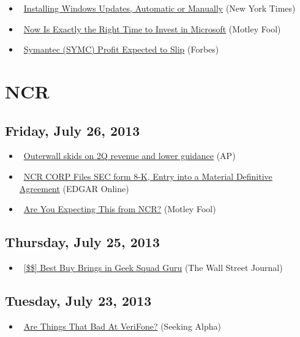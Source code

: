 \documentclass[11pt,asymmetric]{article}
\begin{document}
\begin{itemize}
\item\ \href{http://www.nytimes.com/2013/07/27/technology/personaltech/installing-windows-updates-automatic-or-manually.html?partner=yahoofinance}{Installing Windows Updates, Automatic or Manually} (New York Times)
\item\ \href{http://beta.fool.com/yieke/2013/07/26/it-is-exactly-the-best-time-to-invest-in-microsoft/41255/?source=eogyholnk0000001}{Now Is Exactly the Right Time to Invest in Microsoft} (Motley Fool)
\item\ \href{http://www.forbes.com/sites/narrativescience/2013/07/26/symantec-symc-profit-expected-to-slip/?partner=yahootix}{Symantec (SYMC) Profit Expected to Slip} (Forbes)
\end{itemize}

\section*{NCR}

\subsection*{Friday, July 26, 2013}
\begin{itemize}
\item\ \href{http://finance.yahoo.com/news/outerwall-skids-2q-revenue-lower-141647186.html}{Outerwall skids on 2Q revenue and lower guidance} (AP)
\item\ \href{http://biz.yahoo.com/e/130726/ncr8-k.html}{NCR CORP Files SEC form 8-K, Entry into a Material Definitive Agreement} (EDGAR Online)
\item\ \href{http://www.fool.com/investing/general/2013/07/26/are-you-expecting-this-from-ncr.aspx?source=eptyholnk303100&logvisit=y&npu=y}{Are You Expecting This from NCR?} (Motley Fool)
\end{itemize}
\subsection*{Thursday, July 25, 2013}
\begin{itemize}
\item\ \href{http://online.wsj.com/article/SB10001424127887323610704578627684290388010.html?ru=yahoo&mod=yahoo_hs}{[\$\$] Best Buy Brings in Geek Squad Guru} (The Wall Street Journal)
\end{itemize}
\subsection*{Tuesday, July 23, 2013}
\begin{itemize}
\item\ \href{http://seekingalpha.com/article/1563652-are-things-that-bad-at-verifone?source=yahoo}{Are Things That Bad At VeriFone?} (Seeking Alpha)
\end{itemize}
\end{document}
